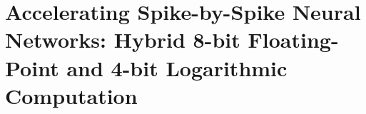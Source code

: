 \chapter{Accelerating Spike-by-Spike Neural Networks: Hybrid 8-bit Floating-Point and 4-bit Logarithmic Computation} \label{chap.sbs}
\minitoc





